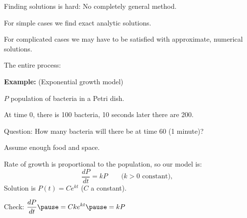 \documentclass[10pt,aspectratio=169]{beamer}
\begin{document}
\begin{frame}
Finding solutions is hard: No completely general method.

\medskip
\pause

For simple cases we find exact analytic solutions.

\medskip
\pause

For complicated cases we may have to be satisfied with approximate, numerical
solutions.

\end{frame}

\begin{frame}

The entire process:

\pause
\medskip

\begin{center}
\end{center}
\end{frame}

\begin{frame}
\textbf{Example:} (Exponential growth model)

\medskip
\pause

$P$ population of bacteria in a Petri dish.

\medskip
\pause

At time 0, there is 100 bacteria, 10 seconds later there are 200.

\pause

Question: How many bacteria will there be at time 60 (1 minute)?

\medskip
\pause

Assume enough food and space.

\medskip
\pause

Rate of growth is proportional to the population, so our model is:
\pause
\[
\frac{dP}{dt} = kP \qquad \text{($k > 0$ constant)},
\]
\pause
Solution is \quad $P(t) = C e^{kt}$ \quad ($C$ a constant).

\medskip
\pause

Check: 
\quad
$\displaystyle
\frac{dP}{dt} \pause = C k e^{kt} \pause = k P$ \pause \quad {\Large\checkmark}

\end{frame}
\end{document}

